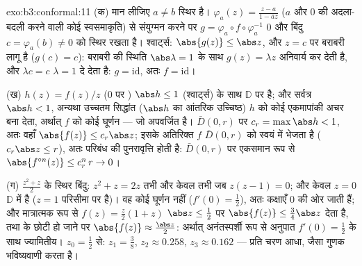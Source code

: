 \begin{solution}{exo:b3:conformal:11}
(क) मान लीजिए $a \neq b$ स्थिर है। $\varphi_a(z) =
\frac{z - a}{1 - \bar az}$ ($a$ और $0$ की अदला-बदली
करने वाली कोई स्वसमाकृति) से संयुग्मन करने पर $g = \varphi_a\circ f\circ\varphi_a^{-1}$ $0$ और बिंदु
$c = \varphi_a(b) \neq 0$ को स्थिर रखता है। श्वार्ट्स: $\abs{g(z)} \leq \abs z$, और $z = c$ पर बराबरी लागू है
($g(c) = c$): बराबरी की स्थिति $\abs\lambda = 1$ के साथ $g(z) = \lambda z$ अनिवार्य कर देती है,
और $\lambda c = c$ $\lambda =
1$ दे देता है: $g = \mathrm{id}$, अतः $f = \mathrm{id}$।

(ख) $h(z) = f(z)/z$ ($0$ पर ) $\abs h \leq 1$ (श्वार्ट्स) के साथ $\mathbb D$
पर  है; और सर्वत्र $\abs h < 1$, अन्यथा उच्चतम सिद्धांत ($\abs h$
का आंतरिक उच्चिष्ठ) $h$ को कोई एकमापांकी अचर बना देता, अर्थात्
$f$ को कोई घूर्णन --- जो अपवर्जित है।  $\bar D(0,r)$ पर $c_r = \max\abs h < 1$, अतः वहाँ
$\abs{f(z)} \leq
c_r\abs z$; इसके अतिरिक्त $f$ $\bar D(0,r)$ को स्वयं में भेजता है ($c_r\abs z \leq r$), अतः
परिबंध की पुनरावृत्ति होती है: $\bar D(0, r)$ पर एकसमान रूप से $\abs{f^{\circ n}(z)} \leq c_r^n\,r \to 0$।

(ग) $\frac{z^2 + z}2$ के स्थिर बिंदु: $z^2 + z = 2z$ तभी और केवल तभी जब $z(z - 1) = 0$; और केवल
$z = 0$ $\mathbb D$ में है ($z = 1$ परिसीमा पर है)। वह कोई घूर्णन नहीं ($f'(0) = \frac12$),
अतः कक्षाएँ $0$ की ओर जाती हैं; और मात्रात्मक रूप से $f(z) = \frac z2(1 + z)$ $\abs z \leq
\frac12$
पर $\abs{f(z)} \leq \frac{3}{4}\abs z$ देता है, तथा  के छोटी हो जाने पर $\abs{f(z)} \approx
\frac{\abs z}2$: अर्थात्
अनंतस्पर्शी रूप से अनुपात $f'(0) = \frac12$ के साथ ज्यामितीय। $z_0 = \frac12$ से: $z_1 = \frac38$,
$z_2 \approx 0.258$, $z_3 \approx 0.162$ --- प्रति चरण आधा, जैसा गुणक भविष्यवाणी करता है।
\end{solution}

